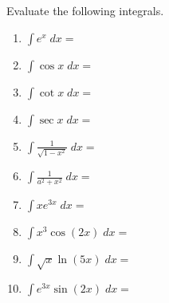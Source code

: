 \documentclass{exam}[12pt]
\begin{document}
\pagestyle{head}

\extraheadheight{.3in}
\extrafootheight{-.3in} 


\vspace{.2in}
\large{
Evaluate the following integrals.
\begin{enumerate}
\item $\displaystyle \int e^x \; dx = $
\vspace{.2in}
\item   $\displaystyle \int \cos x \; dx = $
\vspace{.2in}
\item $\displaystyle \int \cot x \; dx = $
\vspace{.2in}
\item $\displaystyle \int \sec x \; dx = $
\vspace{.2in}
\item $\displaystyle \int \frac{1}{\sqrt{1-x^2}} \; dx = $ 
\vspace{.2in}
\item $\displaystyle \int \frac{1}{a^2+x^2}\; dx = $
\vspace{.2in}

\item $\displaystyle \int  x e^{3x} \; dx = $
\vspace{2.2in}
\pagebreak
\item $\displaystyle \int x^3 \cos(2x)\; dx = $
\vspace{5.2in}

\item $\displaystyle \int \sqrt{x} \ln(5x)\; dx = $
\vspace{.2in}

\pagebreak
\item $\displaystyle \int e^{3x}\sin(2x)\; dx = $
\vspace{.2in}







\end{enumerate}
}
\end{document}
